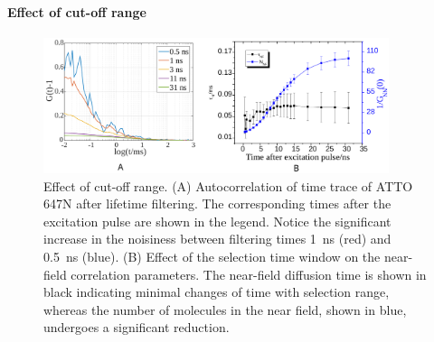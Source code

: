 \paragraph*{Effect of cut-off range}
\begin{figure}%
  \centering
  \includegraphics[width=0.9\textwidth]{cutoff_effect}
  \makeatletter
  \renewcommand{\fnum@figure}{\figurename~S\thefigure}
  \makeatother{}
  \caption{Effect of cut-off range. (A) Autocorrelation of time trace of ATTO 647N after lifetime filtering.
  The corresponding times after the excitation pulse are shown in the legend.
  Notice the significant increase in the noisiness between filtering times \SI{1}{\ns} (red) and \SI{0.5}{\ns} (blue).
  (B) Effect of the selection time window on the near-field correlation parameters.
  The near-field diffusion time is shown in black indicating minimal changes of time with selection range, whereas the number of molecules in the near field, shown in blue, undergoes a significant reduction.}
  \label{SIfig:cutoff-effect}
\end{figure}

